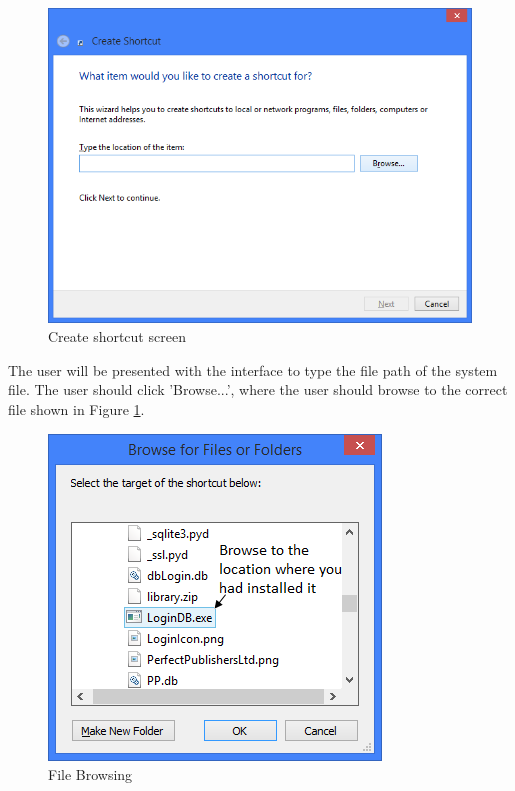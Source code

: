 \begin{figure}[H]
    \includegraphics[width=\textwidth]{./Manual/Installation/CreateShortcut.png}
    \caption{Create shortcut screen}
\end{figure}

The user will be presented with the interface to type the file path of the system file. The user should click 'Browse...', where the user should browse to the correct file shown in Figure \ref{fig:BrowseFile}.

\begin{figure}[H]
    \includegraphics[width=\textwidth]{./Manual/Installation/BrowseFile.png}
    \caption{File Browsing} \label{fig:BrowseFile}
\end{figure}

